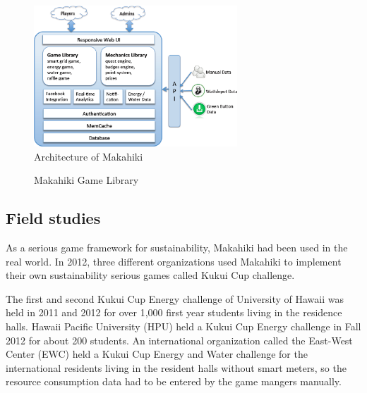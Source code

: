\documentclass{sigchi}
\begin{document}
\begin{figure}
  \center
  \includegraphics[width=3in]{makahiki-system-architecture}
  \caption{Architecture of Makahiki}
  \label{fig:makahiki-architecture}
\end{figure}

\begin{figure}
	\center
		\caption{Makahiki Game Library}
		\label{fig:makahiki-games}
\end{figure}

\subsection{Field studies}

As a serious game framework for sustainability, Makahiki had been used in the real world. In 2012, three different organizations used Makahiki to implement their own sustainability serious games called Kukui Cup challenge.

The first and second Kukui Cup Energy challenge of University of Hawaii was held in 2011 and 2012 for over 1,000 first year students living in the residence halls. Hawaii Pacific University (HPU) held a Kukui Cup Energy challenge in Fall 2012 for about 200 students. An international organization called the East-West Center (EWC) held a Kukui Cup Energy and Water challenge for the international residents living in the resident halls without smart meters, so the resource consumption data had to be entered by the game mangers manually.
\end{document}
